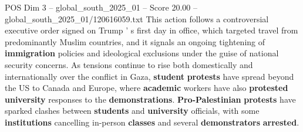 \begin{textsample}{POS Dim 3 – global\_south\_2025\_01 – Score 20.00 – global\_south\_2025\_01/120616059.txt}
This action follows a controversial executive order signed on Trump ' s first day in office, which targeted travel from predominantly Muslim countries, and it signals an ongoing tightening of \textbf{immigration} policies and ideological exclusions under the guise of national security concerns.
As tensions continue to rise both domestically and internationally over the conflict in Gaza, \textbf{student} \textbf{protests} have spread beyond the US to Canada and Europe, where \textbf{academic} workers have also \textbf{protested} \textbf{university} responses to the \textbf{demonstrations}. \textbf{Pro-Palestinian} \textbf{protests} have sparked clashes between \textbf{students} and \textbf{university} officials, with some \textbf{institutions} cancelling in-person \textbf{classes} and several \textbf{demonstrators} \textbf{arrested}.

\end{textsample}
